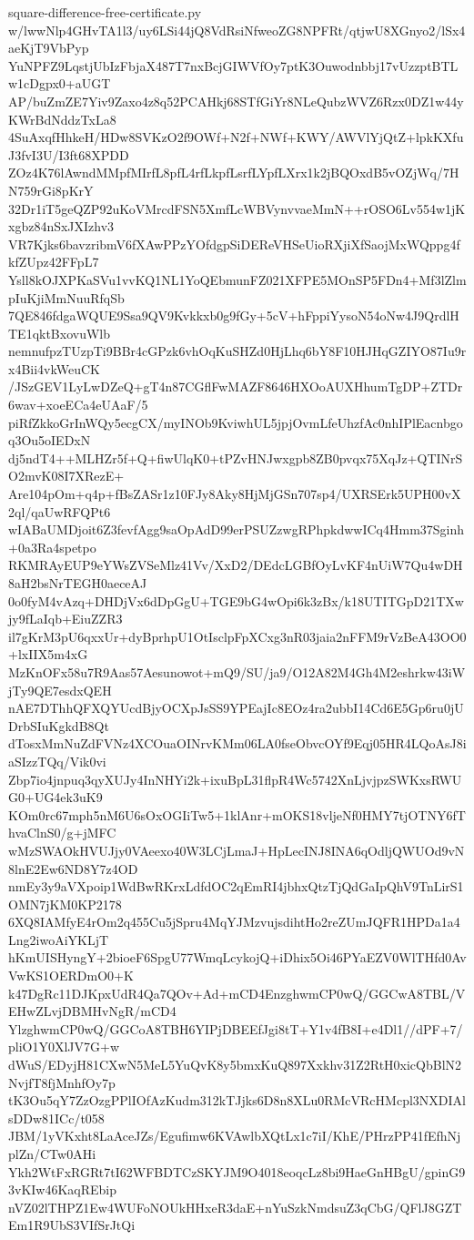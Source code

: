 \documentclass[11pt]{article}
\theoremstyle{definition}
\theoremstyle{remark}
\begin{document}
\begin{filecontents*}[overwrite]{square-difference-free-certificate.py}
w/lwwNlp4GHvTA1l3/uy6LSi44jQ8VdRsiNfweoZG8NPFRt/qtjwU8XGnyo2/lSx4aeKjT9VbPyp
YuNPFZ9LqstjUbIzFbjaX487T7nxBcjGIWVfOy7ptK3Ouwodnbbj17vUzzptBTLw1cDgpx0+aUGT
AP/buZmZE7Yiv9Zaxo4z8q52PCAHkj68STfGiYr8NLeQubzWVZ6Rzx0DZ1w44yKWrBdNddzTxLa8
4SuAxqfHhkeH/HDw8SVKzO2f9OWf+N2f+NWf+KWY/AWVlYjQtZ+lpkKXfuJ3fvI3U/I3ft68XPDD
ZOz4K76lAwndMMpfMIrfL8pfL4rfLkpfLsrfLYpfLXrx1k2jBQOxdB5vOZjWq/7HN759rGi8pKrY
32Dr1iT5geQZP92uKoVMrcdFSN5XmfLcWBVynvvaeMmN++rOSO6Lv554w1jKxgbz84nSxJXIzhv3
VR7Kjks6bavzribmV6fXAwPPzYOfdgpSiDEReVHSeUioRXjiXfSaojMxWQppg4fkfZUpz42FFpL7
Ysll8kOJXPKaSVu1vvKQ1NL1YoQEbmunFZ021XFPE5MOnSP5FDn4+Mf3lZlmpIuKjiMmNuuRfqSb
7QE846fdgaWQUE9Ssa9QV9Kvkkxb0g9fGy+5cV+hFppiYysoN54oNw4J9QrdlHTE1qktBxovuWlb
nemnufpzTUzpTi9BBr4cGPzk6vhOqKuSHZd0HjLhq6bY8F10HJHqGZIYO87Iu9rx4Bii4vkWeuCK
/JSzGEV1LyLwDZeQ+gT4n87CGflFwMAZF8646HXOoAUXHhumTgDP+ZTDr6wav+xoeECa4eUAaF/5
piRfZkkoGrInWQy5ecgCX/myINOb9KviwhUL5jpjOvmLfeUhzfAc0nhIPlEacnbgoq3Ou5oIEDxN
dj5ndT4++MLHZr5f+Q+fiwUlqK0+tPZvHNJwxgpb8ZB0pvqx75XqJz+QTINrSO2mvK08I7XRezE+
Are104pOm+q4p+fBsZASr1z10FJy8Aky8HjMjGSn707sp4/UXRSErk5UPH00vX2ql/qaUwRFQPt6
wIABaUMDjoit6Z3fevfAgg9saOpAdD99erPSUZzwgRPhpkdwwICq4Hmm37Sginh+0a3Ra4spetpo
RKMRAyEUP9eYWsZVSeMlz41Vv/XxD2/DEdcLGBfOyLvKF4nUiW7Qu4wDH8aH2bsNrTEGH0aeceAJ
0o0fyM4vAzq+DHDjVx6dDpGgU+TGE9bG4wOpi6k3zBx/k18UTITGpD21TXwjy9fLaIqb+EiuZZR3
il7gKrM3pU6qxxUr+dyBprhpU1OtIsclpFpXCxg3nR03jaia2nFFM9rVzBeA43OO0+lxIIX5m4xG
MzKnOFx58u7R9Aas57Aesunowot+mQ9/SU/ja9/O12A82M4Gh4M2eshrkw43iWjTy9QE7esdxQEH
nAE7DThhQFXQYUcdBjyOCXpJsSS9YPEajIc8EOz4ra2ubbI14Cd6E5Gp6ru0jUDrbSIuKgkdB8Qt
dTosxMmNuZdFVNz4XCOuaOINrvKMm06LA0fseObvcOYf9Eqj05HR4LQoAsJ8iaSIzzTQq/Vik0vi
Zbp7io4jnpuq3qyXUJy4InNHYi2k+ixuBpL31flpR4Wc5742XnLjvjpzSWKxsRWUG0+UG4ek3uK9
KOm0rc67mph5nM6U6sOxOGIiTw5+1klAnr+mOKS18vljeNf0HMY7tjOTNY6fThvaClnS0/g+jMFC
wMzSWAOkHVUJjy0VAeexo40W3LCjLmaJ+HpLecINJ8INA6qOdljQWUOd9vN8lnE2Ew6ND8Y7z4OD
nmEy3y9aVXpoip1WdBwRKrxLdfdOC2qEmRI4jbhxQtzTjQdGaIpQhV9TnLirS1OMN7jKM0KP2178
6XQ8IAMfyE4rOm2q455Cu5jSpru4MqYJMzvujsdihtHo2reZUmJQFR1HPDa1a4Lng2iwoAiYKLjT
hKmUISHyngY+2bioeF6SpgU77WmqLcykojQ+iDhix5Oi46PYaEZV0WlTHfd0AvVwKS1OERDmO0+K
k47DgRc11DJKpxUdR4Qa7QOv+Ad+mCD4EnzghwmCP0wQ/GGCwA8TBL/VEHwZLvjDBMHvNgR/mCD4
YlzghwmCP0wQ/GGCoA8TBH6YIPjDBEEfJgi8tT+Y1v4fB8I+e4Dl1//dPF+7/pliO1Y0XlJV7G+w
dWuS/EDyjH81CXwN5MeL5YuQvK8y5bmxKuQ897Xxkhv31Z2RtH0xicQbBlN2NvjfT8fjMnhfOy7p
tK3Ou5qY7ZzOzgPPlIOfAzKudm312kTJjks6D8n8XLu0RMcVRcHMcpl3NXDIAlsDDw81ICc/t058
JBM/1yVKxht8LaAceJZs/Egufimw6KVAwlbXQtLx1c7iI/KhE/PHrzPP41fEfhNjplZn/CTw0AHi
Ykh2WtFxRGRt7tI62WFBDTCzSKYJM9O4018eoqcLz8bi9HaeGnHBgU/gpinG93vKIw46KaqREbip
nVZ02lTHPZ1Ew4WUFoNOUkHHxeR3daE+nYuSzkNmdsuZ3qCbG/QFlJ8GZTEm1R9UbS3VIfSrJtQi

\end{filecontents*}
\end{document}
